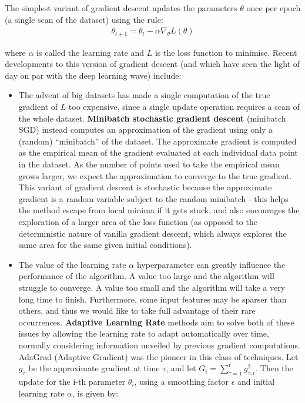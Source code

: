 \documentclass[pdftex,12pt,a4paper]{article}
\theoremstyle{definition}
\theoremstyle{remark}
\begin{document}
\par The simplest variant of gradient descent updates the parameters $\theta$ once per epoch (a single scan of the dataset) using the rule:
\begin{align*}
    \theta_{t+1} = \theta_{t} - \alpha \nabla_\theta L(\theta) 
\end{align*}

where $\alpha$ is called the learning rate and $L$ is the loss function to minimise. Recent developments to this version of gradient descent (and which have seen the light of day on par with the deep learning wave) include:

\begin{itemize}
    \item The advent of big datasets has made a single computation of the true gradient of $L$ too expensive, since a single update operation requires a scan of the whole dataset. \textbf{Minibatch stochastic gradient descent} (minibatch SGD) \cite{Bottou2010} instead computes an approximation of the gradient using only a (random) ``minibatch'' of the dataset. The approximate gradient is computed as the empirical mean of the gradient evaluated at each individual data point in the dataset. As the number of points used to take the empirical mean grows larger, we expect the approximation to converge to the true gradient. This variant of gradient descent is stochastic because the approximate gradient is a random variable subject to the random minibatch - this helps the method escape from local minima if it gets stuck, and also encourages the exploration of a larger area of the loss function (as opposed to the deterministic nature of vanilla gradient descent, which always explores the same area for the same given initial conditions).
    \item The value of the learning rate $\alpha$ hyperparameter can greatly influence the performance of the algorithm. A value too large and the algorithm will struggle to converge. A value too small and the algorithm will take a very long time to finish. Furthermore, some input features may be sparser than others, and thus we would like to take full advantage of their rare occurrences. \textbf{Adaptive Learning Rate} methods aim to solve both of these issues by allowing the learning rate to adapt automatically over time, normally considering information unveiled by previous gradient computations. AdaGrad (Adaptive Gradient) \cite{Duchi2011} was the pioneer in this class of techniques. Let $g_\tau$ be the approximate gradient at time $\tau$, and let $G_i=\sum_{\tau=1}^t g_{\tau, i}^2$. Then the update for the i-th parameter $\theta_i$, using a smoothing factor $\epsilon$ and initial learning rate $\alpha$, is given by:

\end{itemize}
\end{document}
